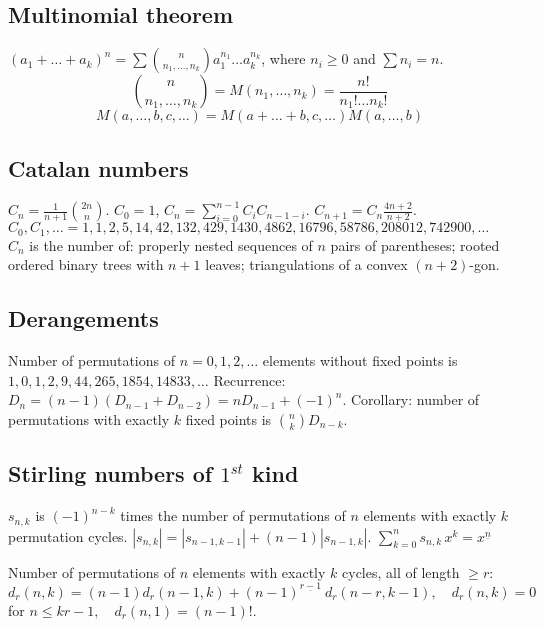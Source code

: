 \documentclass[12pt]{extarticle}
\begin{document}
\begin{multicols*}{2}
\subsection{Multinomial theorem}
$(a_1+\dots+a_k)^n = \sum {n \choose n_1,\dots,n_k} a_1^{n_1} \dots a_k^{n_k}$,
where $n_i \ge 0$ and $\sum n_i=n$. \\
$${n \choose n_1,\dots,n_k} = M(n_1,\dots,n_k) = \frac{n!}{n_1! \dots n_k!}$$
$$M(a,\dots,b,c,\dots) = M(a+\dots+b,c,\dots) M(a,\dots,b)$$


\subsection{Catalan numbers}
$C_n = \frac{1}{n+1} {2n \choose n}$.
\quad $C_0=1$, $C_n=\sum_{i=0}^{n-1} C_i C_{n-1-i}$.
\quad $C_{n+1} = C_n \frac{4n+2}{n+2}$. \\
$C_0, C_1, \ldots = 1, 1, 2, 5, 14, 42, 132, 429, 1430, 4862, 16796,
		58786, 208012, 742900, \ldots$ \\
$C_n$ is the number of:
properly nested sequences of $n$ pairs of parentheses;
rooted ordered binary trees with $n+1$ leaves;
triangulations of a convex $(n+2)$-gon.

\subsection{Derangements}
Number of permutations of $n=0,1,2,\dots$ elements without fixed points is
$1, 0, 1, 2, 9, 44, 265, 1854, 14833, \dots$
Recurrence: $D_n = (n-1)(D_{n-1} + D_{n-2}) = n D_{n-1} + (-1)^n$.
Corollary: number of permutations with exactly $k$ fixed points is ${n \choose k} D_{n-k}$.

\subsection{Stirling numbers of $1^{st}$ kind}
$s_{n,k}$ is $(-1)^{n-k}$ times the number of permutations of $n$ elements with
exactly $k$ permutation cycles.
$|s_{n,k}| = |s_{n-1,k-1}| + (n-1) |s_{n-1,k}|$. \quad
$\sum_{k=0}^n s_{n,k}\,x^k = x^{\underline n}$

Number of permutations of $n$ elements with exactly $k$ cycles,
all of length $\ge r$: \\
$d_r(n,k) = (n-1) d_r(n-1,k) + (n-1)^{\underline {r-1}}\ d_r(n-r,k-1),
\quad d_r(n,k)=0 $ for $ n\le kr-1, \quad d_r(n,1)=(n-1)!$.


\end{multicols*}
\end{document}
